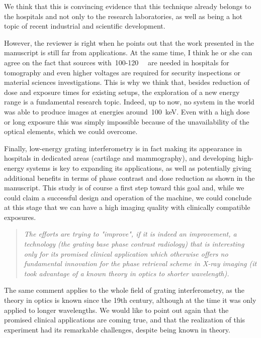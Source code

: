 \documentclass[a4paper,english]{scrartcl}
\newenvironment{reviewerquote}{\begin{quote}\itshape}{\end{quote}}
\begin{document}
We think that this is convincing evidence that this technique already belongs to the
hospitals and not only to the research laboratories, as well as being a hot
topic of recent industrial and scientific development.

However, the reviewer is right when he points out that the work presented in
the manuscript is still far from applications. At the same time, I think he
or she can agree on the fact that sources
with~\num{100}-\SI{120}{\kilo\voltpeak} are needed in
hospitals for tomography and even higher voltages are required for security
inspections or material sciences investigations.
This is why we think that, besides reduction of dose and exposure times for
existing setups, the exploration of a new energy range is a fundamental
research topic. Indeed, up to now, no system in the world was able to
produce images at energies around~\SI{100}{\kilo\eV}. Even with a high
dose or long exposure
this was simply impossible because of the unavailability of the optical
elements, which we could overcome.

Finally, low-energy grating interferometry is in fact making its appearance
in hospitals in dedicated areas (cartilage and mammography), and developing
high-energy systems is key to expanding its applications, as well as
potentially giving
additional benefits in terms of phase contrast and dose reduction as shown
in the manuscript.
This study is of course a first step toward this goal and,
while we could claim a successful design and operation of the machine, we
could conclude at this stage that we can have a high imaging quality with
clinically compatible exposures.

\begin{reviewerquote}
     The efforts are trying to "improve", if it is indeed an improvement, a
     technology (the grating base phase contrast radiology) that is
     interesting only for its promised clinical application which otherwise
     offers no fundamental innovation for the phase retrieval scheme in
     X-ray imaging (it took advantage of a known theory in optics to shorter
     wavelength).
\end{reviewerquote}
The same comment applies to the whole field of grating interferometry, as the
theory in optics is known since the 19th century, although at the time it
was only applied to longer wavelengths. We would like to point out again
that the promised clinical applications are coming true, and that the
realization of this experiment had its remarkable challenges, despite being
known in theory.
\end{document}
